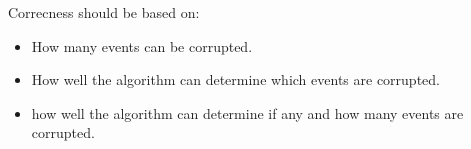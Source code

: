 Correcness should be based on:
\begin{itemize}
    \item How many events can be corrupted.
    \item How well the algorithm can determine which events are corrupted.
    \item how well the algorithm can determine if any and how many events are corrupted.
\end{itemize}









